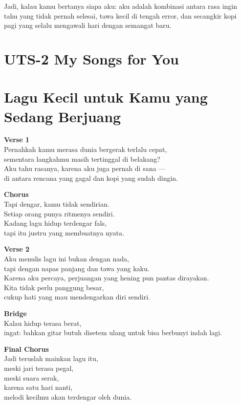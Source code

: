 \documentclass[
  letterpaper,
  DIV=11,
  numbers=noendperiod]{scrreprt}
\begin{document}
Jadi, kalau kamu bertanya siapa aku: aku adalah kombinasi antara rasa
ingin tahu yang tidak pernah selesai, tawa kecil di tengah error, dan
secangkir kopi pagi yang selalu mengawali hari dengan semangat baru.


\chapter{UTS-2 My Songs for You}\label{uts-2-my-songs-for-you}


\chapter{Lagu Kecil untuk Kamu yang Sedang
Berjuang}\label{lagu-kecil-untuk-kamu-yang-sedang-berjuang}

\textbf{Verse 1}\\
Pernahkah kamu merasa dunia bergerak terlalu cepat,\\
sementara langkahmu masih tertinggal di belakang?\\
Aku tahu rasanya, karena aku juga pernah di sana ---\\
di antara rencana yang gagal dan kopi yang sudah dingin.

\textbf{Chorus}\\
Tapi dengar, kamu tidak sendirian.\\
Setiap orang punya ritmenya sendiri.\\
Kadang lagu hidup terdengar fals,\\
tapi itu justru yang membuatnya nyata.

\textbf{Verse 2}\\
Aku menulis lagu ini bukan dengan nada,\\
tapi dengan napas panjang dan tawa yang kaku.\\
Karena aku percaya, perjuangan yang hening pun pantas dirayakan.\\
Kita tidak perlu panggung besar,\\
cukup hati yang mau mendengarkan diri sendiri.

\textbf{Bridge}\\
Kalau hidup terasa berat,\\
ingat: bahkan gitar butuh disetem ulang untuk bisa berbunyi indah lagi.

\textbf{Final Chorus}\\
Jadi teruslah mainkan lagu itu,\\
meski jari terasa pegal,\\
meski suara serak,\\
karena satu hari nanti,\\
melodi kecilmu akan terdengar oleh dunia.
\end{document}
